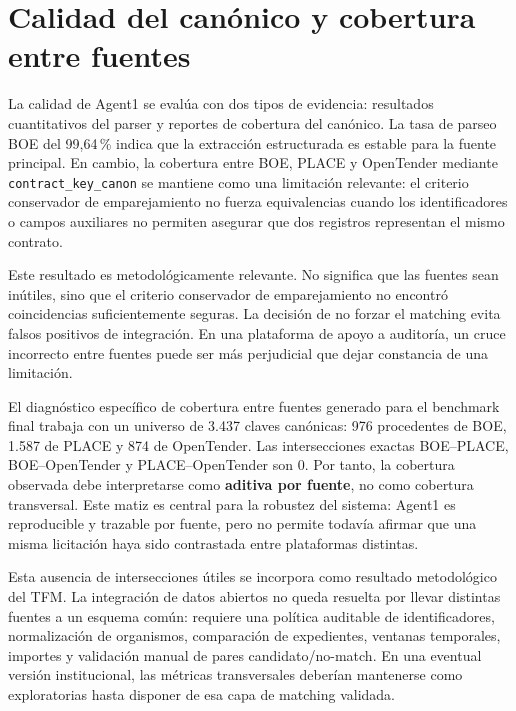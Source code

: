 \documentclass[11pt,a4paper,spanish]{book}
\numberwithin{equation}{chapter}
\numberwithin{figure}{chapter}
\begin{document}
\section{Calidad del can{\'o}nico y cobertura entre fuentes}

La calidad de Agent1 se eval{\'u}a con dos tipos de evidencia: resultados cuantitativos del parser y
reportes de cobertura del can{\'o}nico. La tasa de parseo BOE del 99,64\,\% indica que la extracci{\'o}n
estructurada es estable para la fuente principal. En cambio, la cobertura entre BOE, PLACE y
OpenTender mediante \texttt{contract\_key\_canon} se mantiene como una limitaci{\'o}n relevante: el
criterio conservador de emparejamiento no fuerza equivalencias cuando los identificadores o campos
auxiliares no permiten asegurar que dos registros representan el mismo contrato.

Este resultado es metodol{\'o}gicamente relevante. No significa que las fuentes sean in{\'u}tiles, sino
que el criterio conservador de emparejamiento no encontr{\'o} coincidencias suficientemente seguras.
La decisi{\'o}n de no forzar el matching evita falsos positivos de integraci{\'o}n. En una plataforma
de apoyo a auditor{\'i}a, un cruce incorrecto entre fuentes puede ser m{\'a}s perjudicial que dejar
constancia de una limitaci{\'o}n.

El diagn{\'o}stico espec{\'i}fico de cobertura entre fuentes generado para el benchmark final trabaja
con un universo de 3.437 claves can{\'o}nicas: 976 procedentes de BOE, 1.587 de PLACE y 874 de
OpenTender. Las intersecciones exactas BOE--PLACE, BOE--OpenTender y PLACE--OpenTender son 0. Por
tanto, la cobertura observada debe interpretarse como \textbf{aditiva por fuente}, no como cobertura
transversal. Este matiz es central para la robustez del sistema: Agent1 es reproducible y trazable
por fuente, pero no permite todav{\'i}a afirmar que una misma licitaci{\'o}n haya sido contrastada entre
plataformas distintas.

Esta ausencia de intersecciones {\'u}tiles se incorpora como resultado metodol{\'o}gico del TFM. La
integraci{\'o}n de datos abiertos no queda resuelta por llevar distintas fuentes a un esquema com{\'u}n:
requiere una pol{\'i}tica auditable de identificadores, normalizaci{\'o}n de organismos, comparaci{\'o}n de
expedientes, ventanas temporales, importes y validaci{\'o}n manual de pares candidato/no-match. En una
eventual versi{\'o}n institucional, las m{\'e}tricas transversales deber{\'i}an mantenerse como
exploratorias hasta disponer de esa capa de matching validada.
\end{document}
